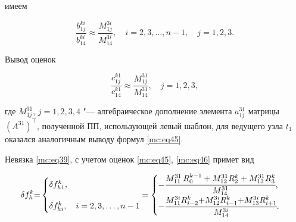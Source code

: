 имеем

\begin{equation}

\label{mc:eq45}

   \frac{b_{1j}^{ki}}{b_{14}^{ki}}\approx\frac{M_{1j}^{3i}}{M_{14}^{3i}},\quad 

   i=2,  3,  \dots,  n-1,\quad  j=1,  2,  3.

\end{equation}



Вывод оценок

\begin{equation}

\label{mc:eq46}

   \frac{c_{1j}^{k1}}{c_{14}^{k1}}\approx\frac{M_{1j}^{31}}{M_{14}^{31}},\quad  j=1,  2,  3,

\end{equation}

где $M_{1j}^{31}$, $j=1,  2,  3,  4$ "--- алгебраическое дополнение элемента $a_{1j}^{31}$  матрицы $   (A^{31})^\top$, полученной ПП, использующей левый шаблон, для ведущего узла $   t_1$ оказался аналогичным выводу формул \eqref{mc:eq45}.



Невязка \eqref{mc:eq39}, с учетом оценок \eqref{mc:eq45}, \eqref{mc:eq46} примет вид

\begin{equation}

\label{mc:eq47}

   \delta f_{h}^k{=}

\begin{cases}  

\delta f_{h1}^k,

\\[4mm]

\delta f_{hi}^k

,\quad    i= 2,  3,  \dots,  n-1

\end{cases} \hspace{-4mm}

=

\begin{cases}

   -\cfrac{M_{11}^{31}\,R_{0}^{k-1} +M_{12}^{31} R_{2}^k + M_{13}^{31} R_{3}^k}{M_{14}^{31}},

\\[2mm]

   -\cfrac{M_{11}^{3i} R_{i-2}^k{+}M_{12}^{3i} R_{i-1}^k{+}M_{13}^{3i} R_{i+1}^k}{M_{14}^{3i}}


.

\end{cases}

\end{equation}



